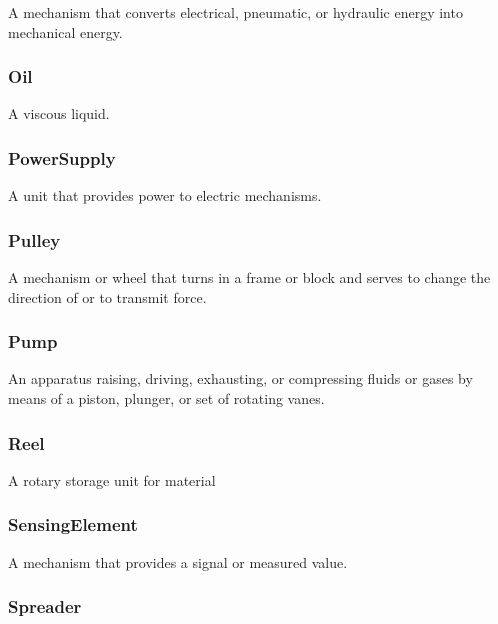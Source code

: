 A mechanism that converts electrical, pneumatic, or hydraulic energy into mechanical energy.


\subsubsection{Oil}
\label{sec:Oil}



A viscous liquid.


\subsubsection{PowerSupply}
\label{sec:PowerSupply}



A unit that provides power to electric mechanisms.


\subsubsection{Pulley}
\label{sec:Pulley}



A mechanism or wheel that turns in a frame or block and serves to change the direction of or to transmit force.


\subsubsection{Pump}
\label{sec:Pump}



An apparatus raising, driving, exhausting, or compressing fluids or gases by means of a piston, plunger, or set of rotating vanes.


\subsubsection{Reel}
\label{sec:Reel}



A rotary storage unit for material


\subsubsection{SensingElement}
\label{sec:SensingElement}



A mechanism that provides a signal or measured value.


\subsubsection{Spreader}
\label{sec:Spreader}




